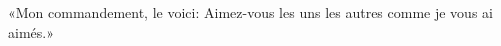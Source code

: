 \encetemps \jesusdisciples
	«Mon commandement, le voici:
	Aimez-vous les uns les autres comme je vous ai aimés.»
